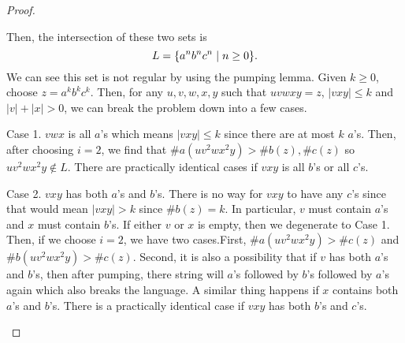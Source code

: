 \documentclass{article}
\newcommand{\setst}{\hspace{1mm} | \hspace{1mm} }
\theoremstyle{definition}
\begin{document}
\begin{enumerate}
\begin{proof}
\begin{enumerate}
		Then, the intersection of these two sets is 
		\[L = \{a^nb^nc^n \setst n \geq 0\}.\] 
		We can see this set is not regular by using the pumping lemma. Given $k \geq 0$, choose $z = a^kb^kc^k$. Then, for any $u,v,w,x,y$ such that $uvwxy = z$, $|vxy| \leq k$ and $|v| + |x| > 0$, we can break the problem down into a few cases. 
		
		Case 1. $vwx$ is all $a$'s which means $|vxy| \leq k$ since there are at most $k$ $a$'s. Then, after choosing $i = 2$, we find that $\#a(uv^2wx^2y) > \#b(z),\#c(z)$ so $uv^2wx^2y \not \in L$. There are practically identical cases if $vxy$ is all $b$'s or all $c$'s.
		
		Case 2. $vxy$ has both $a$'s and $b$'s. There is no way for $vxy$ to have any $c$'s since that would mean $|vxy| > k$ since $\#b(z) = k$. In particular, $v$ must contain $a$'s and $x$ must contain $b$'s. If either $v$ or $x$ is empty, then we degenerate to Case 1. Then, if we choose $i = 2$, we have two cases.First, $\#a(uv^2wx^2y) > \#c(z)$ and $\#b(uv^2wx^2y) > \#c(z)$. Second, it is also a possibility that if $v$ has both $a$'s and $b$'s, then after pumping, there string will $a$'s followed by $b$'s followed by $a$'s again which also breaks the language. A similar thing happens if $x$ contains both $a$'s and $b$'s. There is a practically identical case if $vxy$ has both $b$'s and $c$'s.
		

\end{enumerate}
\end{proof}
\end{enumerate}
\end{document}
